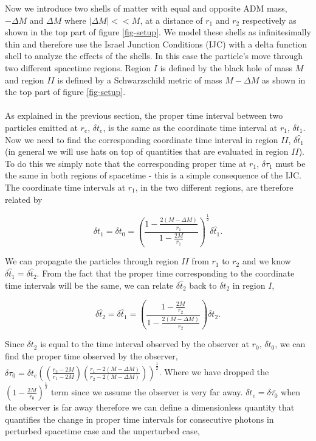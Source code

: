 \documentclass[aps,showpacs,twocolumn,floats,prd,superscriptaddress,nofootinbib]{revtex4-1}
\begin{document}
Now we introduce two shells of matter with equal and opposite ADM mass, $-\Delta M$ and $\Delta M$ where $|\Delta M|<<M$, at a distance of $r_1$ and $r_2$ respectively as shown in the top part of figure \ref{fig-setup}. We model these shells as infinitesimally thin and therefore use the Israel Junction Conditions (IJC) \cite{Isr66} with a delta function shell to analyze the effects of the shells. In this case the particle's move through two different spacetime regions. Region $I$ is defined by the black hole of mass $M$ and region $II$ is defined by a Schwarzschild metric of mass $M-\Delta M$ as shown in the top part of figure \ref{fig-setup}.
\\
\\
As explained in the previous section, the proper time interval between two particles emitted at $r_e$, $\delta t_e$, is the same as the coordinate time interval at $r_1$, $\delta t_1$. Now we need to find the corresponding coordinate time interval in region $II$, $\delta \hat{t}_1$ (in general we will use hats on top of quantities that are evaluated in region $II$). To do this we simply note that the corresponding proper time at $r_1$, $\delta \tau_1$ must be the same in both regions of spacetime - this is a simple consequence of the IJC. The coordinate time intervals at $r_1$, in the two different regions, are therefore related by

\begin{equation}
	\delta t_1 = \delta t_0 = \left( \frac{1 - \frac{2(M - \Delta M)}{r_1}}{1 - \frac{2M}{r_1}} \right)^\frac{1}{2} \delta \hat{t}_1.
\end{equation}

We can propagate the particles through region $II$ from $r_1$ to $r_2$ and we know $\delta \hat{t}_1 = \delta \hat{t}_2$. From the fact that the proper time corresponding to the coordinate time intervals will be the same, we can relate $\delta \hat{t}_2$ back to $\delta t_2$ in region $I$, 

\begin{equation}
	\delta \hat{t}_2 = \delta \hat{t}_1= \left( \frac{1 - \frac{2M}{r_2}}{1 - \frac{2(M- \Delta M)}{r_2}} \right) \delta t_2.	\label{7}
\end{equation}

Since $\delta t_2$ is equal to the time interval observed by the observer at $r_0$, $\delta t_0$, we can find the proper time observed by the observer, $\delta \tau_0  = \delta t_e \left( \left( \frac{r_2 - 2M}{r_1 - 2M} \right) \left( \frac{r_1 - 2(M-\Delta M)}{r_2 - 2(M - \Delta M)} \right) \right)^\frac{1}{2}$. Where we have dropped the $\left( 1 - \frac{2M}{r_0} \right)^\frac{1}{2}$ term since we assume the observer is very far away. $\delta t_e = \delta \bar{\tau_0}$ when the observer is far away therefore we can define a dimensionless quantity that quantifies the change in proper time intervals for consecutive photons in perturbed spacetime case and the unperturbed case, 
\end{document}
